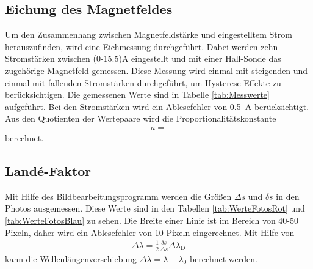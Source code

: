 \subsection{Eichung des Magnetfeldes}
Um den Zusammenhang zwischen Magnetfeldstärke und eingestelltem Strom herauszufinden, wird eine Eichmessung durchgeführt. Dabei werden zehn Stromstärken zwischen (0-15.5)\si{\ampere} eingestellt und mit einer Hall-Sonde das zugehörige Magnetfeld gemessen. Diese Messung wird einmal mit steigenden und einmal mit fallenden Stromstärken durchgeführt, um Hysterese-Effekte zu berücksichtigen. Die gemessenen Werte sind in Tabelle \ref{tab:Messwerte} aufgeführt. Bei den Stromstärken wird ein Ablesefehler von \SI{0.5}{\ampere} berücksichtigt. Aus den Quotienten der Wertepaare wird die Proportionalitätskonstante 
\begin{align}
	a = 
\end{align}
berechnet.


\subsection{Landé-Faktor}
Mit Hilfe des Bildbearbeitungsprogramm werden die Größen $\Delta s$ und $\delta s$ in den Photos ausgemessen. Diese Werte sind in den Tabellen \ref{tab:WerteFotosRot} und \ref{tab:WerteFotosBlau} zu sehen. Die Breite einer Linie ist im Bereich von 40-50 Pixeln, daher wird ein Ablesefehler von 10 Pixeln eingerechnet. Mit Hilfe von
\begin{align}
	\Delta\lambda = \frac{1}{2}\frac{\delta s}{\Delta s}\Delta\lambda_\text{D}
\end{align}
kann die Wellenlängenverschiebung $\Delta\lambda = \lambda - \lambda_0$ berechnet werden.

